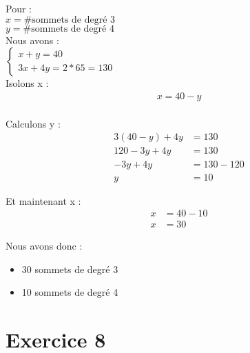 \documentclass[fontsize=10pt]{article}
\begin{document}
Pour :\\
$x = \#\text{sommets de degré } 3$\\
$y = \#\text{sommets de degré } 4$\\

Nous avons :\\
$\begin{cases}
    x + y = 40\\
    3x + 4y = 2 * 65 = 130
\end{cases}$\\

Isolons x :
\vspace{-.8em}
\begin{align*}
x = 40 - y\\
\end{align*}
\vspace{-3em}

Calculons y :
\vspace{-.8em}
\begin{align*}
    3(40 - y) + 4y &= 130\\
    120 - 3y + 4y &= 130\\
    -3y + 4y &= 130 - 120\\
    y &= 10
\end{align*}

Et maintenant x :
\vspace{-.8em}
\begin{align*}
x &= 40 - 10\\
x &= 30
\end{align*}

Nous avons donc :
\begin{itemize}
    \itemsep0em
    \item 30 sommets de degré 3
    \item 10 sommets de degré 4
\end{itemize}


\section*{Exercice 8}
\end{document}
